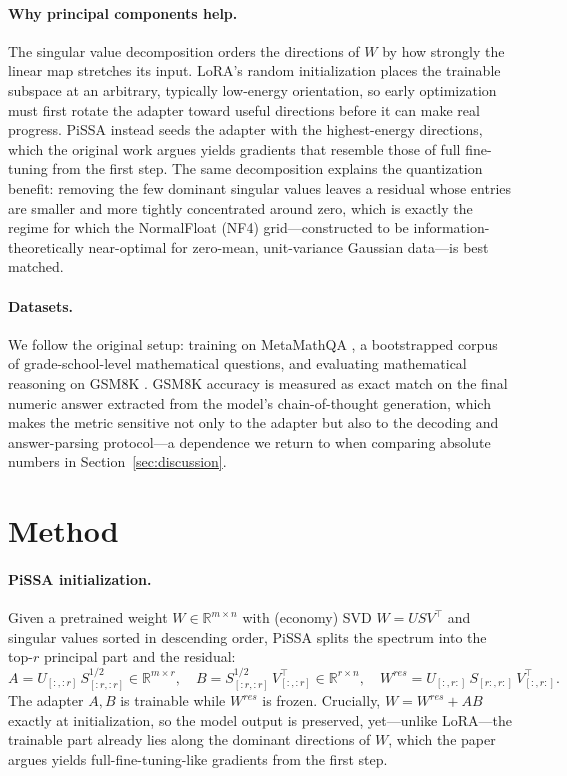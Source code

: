 \documentclass[mlmain]{jmlr}
\begin{document}
\paragraph{Why principal components help.} The singular value decomposition orders the directions of $W$ by how strongly the linear map stretches its input. LoRA's random initialization places the trainable subspace at an arbitrary, typically low-energy orientation, so early optimization must first rotate the adapter toward useful directions before it can make real progress. PiSSA instead seeds the adapter with the highest-energy directions, which the original work argues yields gradients that resemble those of full fine-tuning from the first step. The same decomposition explains the quantization benefit: removing the few dominant singular values leaves a residual whose entries are smaller and more tightly concentrated around zero, which is exactly the regime for which the NormalFloat (NF4) grid---constructed to be information-theoretically near-optimal for zero-mean, unit-variance Gaussian data---is best matched.

\paragraph{Datasets.} We follow the original setup: training on MetaMathQA \citep{yu2024metamath}, a bootstrapped corpus of grade-school-level mathematical questions, and evaluating mathematical reasoning on GSM8K \citep{cobbe2021gsm8k}. GSM8K accuracy is measured as exact match on the final numeric answer extracted from the model's chain-of-thought generation, which makes the metric sensitive not only to the adapter but also to the decoding and answer-parsing protocol---a dependence we return to when comparing absolute numbers in Section~\ref{sec:discussion}.

\section{Method}
\label{sec:method}
\paragraph{PiSSA initialization.} Given a pretrained weight $W \in \mathbb{R}^{m\times n}$ with (economy) SVD $W = U S V^\top$ and singular values sorted in descending order, PiSSA splits the spectrum into the top-$r$ principal part and the residual:
\[
A = U_{[:,:r]}\, S_{[:r,:r]}^{1/2}\in\mathbb{R}^{m\times r},\quad
B = S_{[:r,:r]}^{1/2}\, V_{[:,:r]}^\top\in\mathbb{R}^{r\times n},\quad
W^{res} = U_{[:,r:]}\, S_{[r:,r:]}\, V_{[:,r:]}^\top.
\]
The adapter $A,B$ is trainable while $W^{res}$ is frozen. Crucially, $W = W^{res} + AB$ exactly at initialization, so the model output is preserved, yet---unlike LoRA---the trainable part already lies along the dominant directions of $W$, which the paper argues yields full-fine-tuning-like gradients from the first step.
\end{document}
